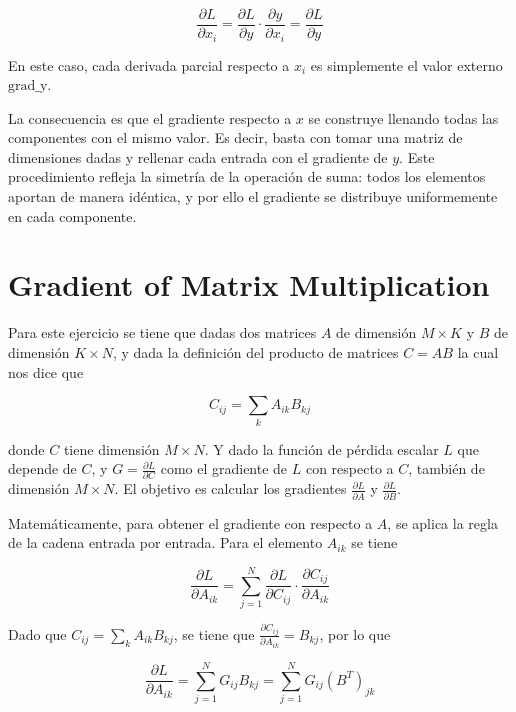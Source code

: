 \documentclass[12pt, letterpaper]{article}
\begin{document}
\[
\frac{\partial L}{\partial x_i} = \frac{\partial L}{\partial y} \cdot \frac{\partial y}{\partial x_i} = \frac{\partial L}{\partial y}
\]



En este caso, cada derivada parcial respecto a \(x_i\) es simplemente el valor externo \(\text{grad\_y}\). 

La consecuencia es que el gradiente respecto a \(x\) se construye llenando todas las componentes con el mismo valor. 
Es decir, basta con tomar una matriz de dimensiones dadas y rellenar cada entrada con el gradiente de \(y\). 
Este procedimiento refleja la simetría de la operación de suma: todos los elementos aportan de manera idéntica, 
y por ello el gradiente se distribuye uniformemente en cada componente.


\newpage

\section{Gradient of Matrix Multiplication}

Para este ejercicio se tiene que dadas dos matrices \(A\) de dimensión \(M \times K\) y \(B\) de dimensión \(K \times N\), y dada la definición del producto de matrices \(C = AB\) la cual nos dice que 

\[
C_{ij} = \sum_{k} A_{ik} B_{kj}
\]

donde \(C\) tiene dimensión \(M \times N\). Y dado la función de pérdida escalar \(L\) que depende de \(C\), y \(G = \frac{\partial L}{\partial C}\) como el gradiente de \(L\) con respecto a \(C\), también de dimensión \(M \times N\). El objetivo es calcular los gradientes \(\frac{\partial L}{\partial A}\) y \(\frac{\partial L}{\partial B}\).

Matemáticamente, para obtener el gradiente con respecto a \(A\), se aplica la regla de la cadena entrada por entrada. Para el elemento \(A_{ik}\) se tiene 

\[
\frac{\partial L}{\partial A_{ik}} = \sum_{j=1}^{N} \frac{\partial L}{\partial C_{ij}} 
\cdot \frac{\partial C_{ij}}{\partial A_{ik}}
\]



Dado que \(C_{ij} = \sum_{k} A_{ik} B_{kj}\), se tiene que 
\(\frac{\partial C_{ij}}{\partial A_{ik}} = B_{kj}\), por lo que



\[
\frac{\partial L}{\partial A_{ik}} = \sum_{j=1}^{N} G_{ij} B_{kj} = 
\sum_{j=1}^{N} G_{ij} (B^T)_{jk}
\]
\end{document}

